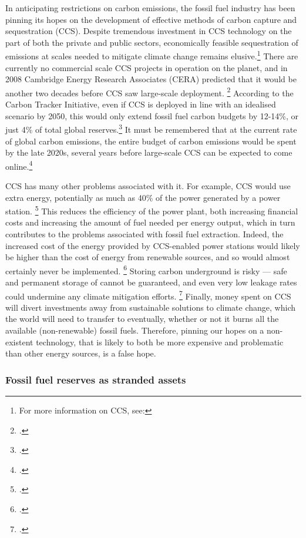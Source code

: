 In anticipating restrictions on carbon emissions, the fossil fuel industry has been pinning its hopes on the development of effective methods of carbon capture and sequestration (CCS). 
Despite tremendous investment in CCS technology on the part of both the private and public sectors, economically feasible sequestration of emissions at scales needed to mitigate climate change remains elusive.\footnote{For more information on CCS, see: }
There are currently no commercial scale CCS projects in operation on the planet, and in 2008 Cambridge Energy Research Associates (CERA) predicted that it would be another two decades before CCS saw large-scale deployment. \footcite{CERACrossing}
According to the Carbon Tracker Initiative, even if CCS is deployed in line with an idealised scenario by 2050, this would only extend fossil fuel carbon budgets by 12-14\%, or just 4\% of total global reserves.\footcite{CTI2013}
It must be remembered that at the current rate of global carbon emissions, the entire budget of carbon emissions would be spent by the late 2020s, several years before large-scale CCS can be expected to come online.\footcite{CTI2012}

CCS has many other problems associated with it. For example, CCS would use extra energy, potentially as much as 40\% of the power generated by a power station. \footcite{GPCCS}
This reduces the efficiency of the power plant, both increasing financial costs and increasing the amount of fuel needed per energy output, which in turn contributes to the problems associated with fossil fuel extraction.
Indeed, the increased cost of the energy provided by CCS-enabled power stations would likely be higher than the cost of energy from renewable sources, and so would almost certainly never be implemented. \footcite{SmartPlanetCCS}
Storing carbon underground is risky --- safe and permanent storage of  cannot be guaranteed, and even very low leakage rates could undermine any climate mitigation efforts. \footcite{GPCCS}
Finally, money spent on CCS will divert investments away from sustainable solutions to climate change, which the world will need to transfer to eventually, whether or not it burns all the available (non-renewable) fossil fuels.
Therefore, pinning our hopes on a non-existent technology, that is likely to both be more expensive and problematic than other energy sources, is a false hope.



	\subsubsection {Fossil fuel reserves as stranded assets} 



